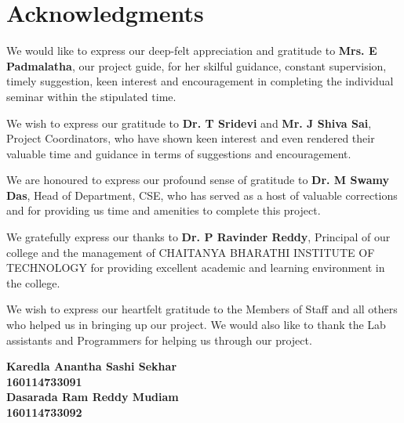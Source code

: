\cleardoublepage
{}
{}
\chapter*{Acknowledgments}
\vspace{-0.55in}
We would like to express our deep-felt appreciation and gratitude to \textbf{Mrs. E Padmalatha}, our project guide, for her skilful guidance, constant supervision, timely suggestion, keen interest and encouragement in completing the individual seminar within the stipulated time.
\par
We wish to express our gratitude to \textbf{Dr. T Sridevi} and \textbf{Mr. J Shiva Sai}, Project Coordinators, who have shown keen interest and even rendered their valuable time and guidance in terms of suggestions and encouragement.
\par
We are honoured to express our profound sense of gratitude to \textbf{Dr. M Swamy Das}, Head of Department, CSE, who has served as a host of valuable corrections and for providing us time and amenities to complete this project.
\par
We gratefully express our thanks to \textbf{Dr. P Ravinder Reddy}, Principal of our college and the management of CHAITANYA BHARATHI INSTITUTE OF TECHNOLOGY for providing excellent academic and learning environment in the college.
\par
We wish to express our heartfelt gratitude to the Members of Staff and all others who helped us in bringing up our project. We would also like to thank the Lab assistants and Programmers for helping us through our project.
\\
\begin{flushright}
\textbf{Karedla Anantha Sashi Sekhar}\\\textbf{160114733091}\\\textbf{Dasarada Ram Reddy Mudiam}\\\textbf{160114733092}
\end{flushright}
\newpage

